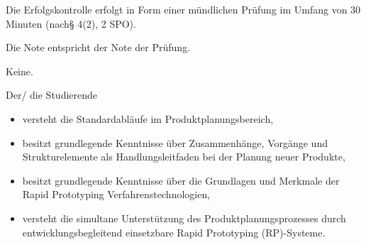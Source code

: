 \begin{course}

\setdoclanguagegerman
{}



\coursehead


\label{cour_7501.dp_997}


\begin{styleenv}
\begin{assessment}
Die Erfolgskontrolle erfolgt in Form einer mündlichen Prüfung im Umfang von 30 Minuten (nach§ 4(2), 2 SPO).

 

Die Note entspricht der Note der Prüfung.


\end{assessment}

\begin{conditions}Keine.\end{conditions}


\end{styleenv}

\begin{learningoutcomes}
Der/ die Studierende

 \begin{itemize}\item versteht die Standardabläufe im Produktplanungsbereich,  \item besitzt grundlegende Kenntnisse über Zusammenhänge, Vorgänge und Strukturelemente als Handlungsleitfaden bei der Planung neuer Produkte,  \item besitzt grundlegende Kenntnisse über die Grundlagen und Merkmale der Rapid Prototyping Verfahrenstechnologien,  \item versteht die simultane Unterstützung des Produktplanungsprozesses durch entwicklungsbegleitend einsetzbare Rapid Prototyping (RP)-Systeme.  \end{itemize}
\end{learningoutcomes}


\end{course}

